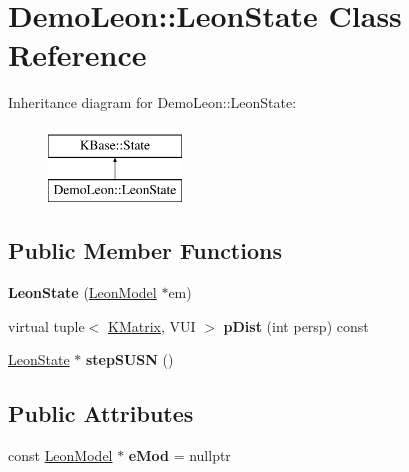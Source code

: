 \hypertarget{class_demo_leon_1_1_leon_state}{\section{Demo\-Leon\-:\-:Leon\-State Class Reference}
\label{class_demo_leon_1_1_leon_state}
}
Inheritance diagram for Demo\-Leon\-:\-:Leon\-State\-:\begin{figure}[H]
\begin{center}
\leavevmode
\includegraphics[height=2.000000cm]{class_demo_leon_1_1_leon_state}
\end{center}
\end{figure}
\subsection*{Public Member Functions}
\begin{DoxyCompactItemize}
\item 
\hypertarget{class_demo_leon_1_1_leon_state_a0e5f459528f4801a4560134111f7686f}{{\bfseries Leon\-State} (\hyperlink{class_demo_leon_1_1_leon_model}{Leon\-Model} $\ast$em)}\label{class_demo_leon_1_1_leon_state_a0e5f459528f4801a4560134111f7686f}

\item 
\hypertarget{class_demo_leon_1_1_leon_state_ab2a009cd1b0b6413d695e819346c8e5e}{virtual tuple$<$ \hyperlink{class_k_base_1_1_k_matrix}{K\-Matrix}, V\-U\-I $>$ {\bfseries p\-Dist} (int persp) const }\label{class_demo_leon_1_1_leon_state_ab2a009cd1b0b6413d695e819346c8e5e}

\item 
\hypertarget{class_demo_leon_1_1_leon_state_a96d90fb82535febd36bbfdf8be8c7286}{\hyperlink{class_demo_leon_1_1_leon_state}{Leon\-State} $\ast$ {\bfseries step\-S\-U\-S\-N} ()}\label{class_demo_leon_1_1_leon_state_a96d90fb82535febd36bbfdf8be8c7286}

\end{DoxyCompactItemize}
\subsection*{Public Attributes}
\begin{DoxyCompactItemize}
\item 
\hypertarget{class_demo_leon_1_1_leon_state_adbf4164390a52544c94c9b90460910b7}{const \hyperlink{class_demo_leon_1_1_leon_model}{Leon\-Model} $\ast$ {\bfseries e\-Mod} = nullptr}\label{class_demo_leon_1_1_leon_state_adbf4164390a52544c94c9b90460910b7}

\end{DoxyCompactItemize}
